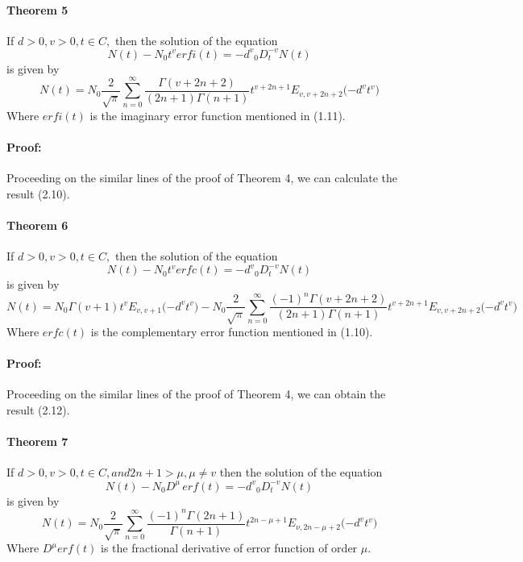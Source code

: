 \documentclass{article}
\begin{document}
\paragraph{Theorem 5}
If $d > 0, v > 0, t \in C,$ then the solution of the equation
\begin{equation}
    N(t) - N_0{t^v}erfi(t) = {-d^v}{_0D_t^{-v}}N(t)
\end{equation}
is given by
\begin{equation}
    N(t) = N_0
    \frac{2}{\sqrt{\pi}}
    \sum_{n = 0}^{\infty}
    \frac{\Gamma{(v+2n+2)}}{{(2n+1)}\Gamma{(n+1)}}
    t^{v+2n+1}
    E_{v,v+2n+2}
    \Big({-d^v}{t^v}\Big)
\end{equation}
Where $erfi(t)$ is the imaginary error function mentioned in (1.11).
\paragraph{Proof:}
Proceeding on the similar lines of the proof of Theorem 4, we can calculate the result (2.10).
\paragraph{Theorem 6}
If $d > 0, v > 0, t \in C,$ then the solution of the equation
\begin{equation}
    N(t) - N_0{t^v}erfc(t) = {-d^v}{_0D_t^{-v}}N(t)
\end{equation}
is given by
\begin{equation}
    N(t) = N_0
    \Gamma{(v+1)}
    {t^v}E_{v,v+1}
    \big({-d^v}{t^v}\big)
    -{N_0}\frac{2}{\sqrt{\pi}}
    \sum_{n = 0}^{\infty}
    \frac{{(-1)^n}\Gamma{(v+2n+2)}}{{(2n+1)}\Gamma{(n+1)}}
    t^{v+2n+1}
    E_{v,v+2n+2}
    \Big({-d^v}{t^v}\Big)
\end{equation}
Where $erfc(t)$ is the complementary error function mentioned in (1.10).
\paragraph{Proof:}
Proceeding on the similar lines of the proof of Theorem 4, we can obtain the result (2.12).
\paragraph{Theorem 7}
If $d > 0, v > 0, t \in C, and {2n+1} > \mu , \mu \neq {v} $ then the solution of the equation
\begin{equation}
    N(t) - {N_0} {D^{\mu}} \, erf(t) = {-d^v}{_0D_t^{-v}}N(t)
\end{equation}
is given by
\begin{equation}
    N(t) = N_0
    \frac{2}{\sqrt{\pi}}
    \sum_{n = 0}^{\infty}
    \frac{{(-1)^n}\Gamma{(2n+1)}}{{\Gamma{(n+1)}}}
    t^{2n-{\mu}+1}
    E_{\nu,2n- \mu +2}
    \Big({-d^v}{t^v}\Big)
\end{equation}
Where $D^{\mu}erf(t)$ is the fractional derivative of error function of order $\mu$.
\end{document}
